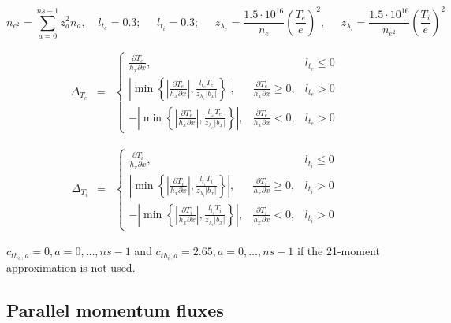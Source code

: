 \documentclass[a4paper,10pt]{report}
\begin{document}
\begin{equation*}
n_{e^2 }= \sum \limits^{ns-1}_{a=0} z_a^2 n_a, \;\;\;\ l_{t_e}=0.3; \;\;\;\;\; l_{t_i}=0.3; \;\;\;\;\; z_{\lambda_e}=\frac{1.5\cdot
10^{16}}{n_e} \left( \frac{T_e} e \right)^2, \;\;\;\;\; z_{\lambda_i}=\frac{1.5 \cdot 10^{16}}{n_{e^2}}\left(\frac{T_i} e\right)^2
\end{equation*}

\begin{equation}
\begin{matrix}
\Delta _{T_e} & =
& \left\{
\begin{matrix}
\frac{\partial T_e}{h_x\partial x}, && l_{t_e} \leq 0 \\

\left|
	\min \left\{
		\left| \frac{\partial T_e}{h_x \partial x} \right|,
		       \frac{l_{t_e} T_e}{z_{\lambda_e}|b_x|}
	\right\}
\right|,
& \frac{\partial T_e}{h_x \partial x} \ge 0, & l_{t_e}>0 \\

-\left|
	\min \left\{
		\left|
			\frac{\partial T_e}{h_x \partial x} \right|,
		        \frac{l_{t_e} T_e}{z_{\lambda_e}|b_x|}			
	\right\}
\right|,
& \frac{\partial T_e}{h_x \partial x} < 0, & l_{t_e} > 0
\end{matrix} \right.
\end{matrix}
\end{equation}

\begin{equation}
\begin{matrix}
\Delta _{T_i} & =
& \left\{
\begin{matrix}
\frac{\partial T_i}{h_x\partial x}, && l_{t_i} \leq 0 \\
\left|
	\min \left\{
		\left| \frac{\partial T_i}{h_x \partial x}
		\right|, \frac{l_{t_i} T_i}{z_{\lambda_i}|b_x|} 				
	\right\}
\right|,
& \frac{\partial T_i}{h_x \partial x} \ge 0, & l_{t_i}>0 \\
-\left|
	\min \left\{
		\left|
			\frac{\partial T_i}{h_x \partial x}
		\right|, \frac{l_{t_i} T_i}{z_{\lambda_i}|b_x|}
	\right\}
\right|,
& \frac{\partial T_i}{h_x \partial x} < 0, & l_{t_i} > 0
\end{matrix} \right.
\end{matrix}
\end{equation}

$c_{th_e,a} = 0, a=0,\ldots,ns-1$ and $c_{th_i,a}=2.65, a=0,\ldots, ns-1$ if the 21-moment approximation is not used.

\subsection{Parallel momentum fluxes}
\end{document}
